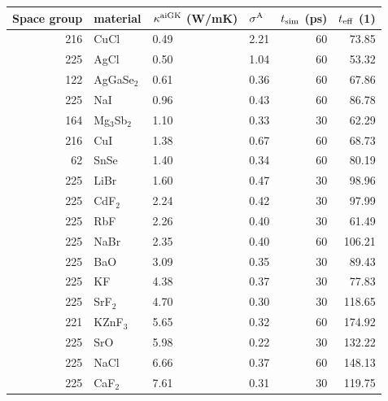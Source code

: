 \begin{table}[ht]
  \centering
  \selectfont
\begin{tabularx}{\linewidth}{rXXXrr}
\toprule
Space group  &    material & $\kappa^{\rm aiGK}$ (W/mK) & $\sigma^\mathrm{A}$  & $t_{\rm sim}$ (ps)  & $t_{\rm eff}$ (1) \\
\midrule
         216 &         CuCl &             0.49 &       2.21 &         60 &      73.85 \\
         225 &         AgCl &             0.50 &       1.04 &         60 &      53.32 \\
         122 &   AgGaSe$_2$ &             0.61 &       0.36 &         60 &      67.86 \\
         225 &          NaI &             0.96 &       0.43 &         60 &      86.78 \\
         164 & Mg$_3$Sb$_2$ &             1.10 &       0.33 &         30 &      62.29 \\
         216 &          CuI &             1.38 &       0.67 &         60 &      68.73 \\
          62 &         SnSe &             1.40 &       0.34 &         60 &      80.19 \\
         225 &         LiBr &             1.60 &       0.47 &         30 &      98.96 \\
         225 &      CdF$_2$ &             2.24 &       0.42 &         30 &      97.99 \\
         225 &          RbF &             2.26 &       0.40 &         30 &      61.49 \\
         225 &         NaBr &             2.35 &       0.40 &         60 &     106.21 \\
         225 &          BaO &             3.09 &       0.35 &         30 &      89.43 \\
         225 &           KF &             4.38 &       0.37 &         30 &      77.83 \\
         225 &      SrF$_2$ &             4.70 &       0.30 &         30 &     118.65 \\
         221 &     KZnF$_3$ &             5.65 &       0.32 &         60 &     174.92 \\
         225 &          SrO &             5.98 &       0.22 &         30 &     132.22 \\
         225 &         NaCl &             6.66 &       0.37 &         60 &     148.13 \\
         225 &      CaF$_2$ &             7.61 &       0.31 &         30 &     119.75 \\

\end{tabularx}
\end{table}
